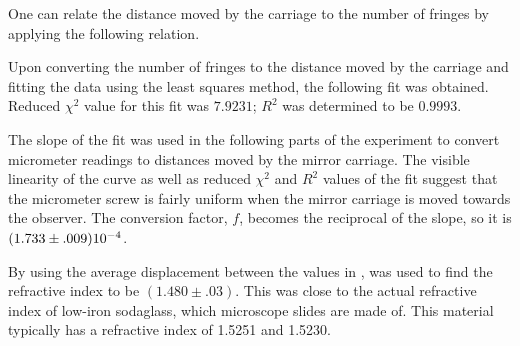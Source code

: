 \begin{paper}
	
	One can relate the distance moved by the carriage to the number of fringes by applying the following relation.
	
	\begin{paperwhere}
    \end{paperwhere}
    
    Upon converting the number of fringes to the distance moved by the carriage and fitting the data using the least squares method, the following fit was obtained. Reduced \( \chi^2 \) value for this fit was \( 7.9231 \); \( R^2 \) was determined to be \( 0.9993 \). 
    

	The slope of the fit was used in the following parts of the experiment to convert micrometer readings to distances moved by the mirror carriage. The visible linearity of the curve as well as reduced \( \chi^2 \) and \( R^2 \) values of the fit suggest that the micrometer screw is fairly uniform when the mirror carriage is moved towards the observer. The conversion factor, $f$, becomes the reciprocal of the slope, so it is $(1.733\pm.009)\SI{E-4}{}$.
	
	\papereq{Index}{\mu=\frac{Mf}{t}+1}{AF, 2014}
	\begin{paperwhere}
	\end{paperwhere}
	
	By using the average displacement between the values in \figWLF, \eqIndex was used to find the refractive index to be $(1.480\pm.03)$. This was close to the actual refractive index of low-iron sodaglass, which microscope slides are made of. This material typically has a refractive index of 1.5251 and 1.5230.
	

\end{paper}
